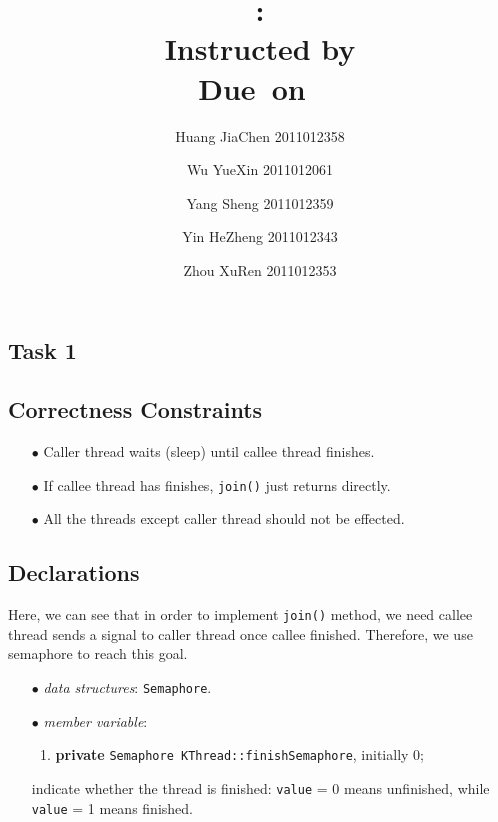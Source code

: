 \documentclass{article}
\title{\textmd{\bf \Class: \Title}\\{\large Instructed by \textit{\ClassInstructor}}\\\normalsize\vspace{0.1in}\small{Due\ on\ \DueDate}}
\date{}
\author{%
  Huang JiaChen 2011012358 \and
  Wu YueXin 2011012061 \and
  Yang Sheng 2011012359 \and
  Yin HeZheng 2011012343 \and
  Zhou XuRen 2011012353}
\begin{document}
  \begin{spacing}{1.1}
    \maketitle \thispagestyle{empty}


\theoremstyle{plain} \newtheorem{computational}{Definition}
    \section{Task 1}

\subsection{Correctness Constraints}
\begin{enumerate}
  \item[$\bullet$] Caller thread waits (sleep) until callee thread finishes.
  \item[$\bullet$] If callee thread has finishes, \texttt{join()} just returns
    directly.
  \item[$\bullet$] All the threads except caller thread should not be effected. 
\end{enumerate}

\subsection{Declarations}
Here, we can see that in order to implement \texttt{join()} method, we need callee
thread sends a signal to caller thread once callee finished. Therefore, we use
semaphore to reach this goal. 
\begin{enumerate}
  \item[$\bullet$] \textit{data structures}: \texttt{Semaphore}.
  \item[$\bullet$] \textit{member variable}:
    \begin{enumerate}

  \item \textbf{private} \texttt{Semaphore KThread::finishSemaphore}, initially 0;
\end{enumerate}
indicate whether the thread is finished: \texttt{value} = 0 means unfinished, while
\texttt{value} = 1 means finished.

\end{enumerate}


\end{spacing}
\end{document}
